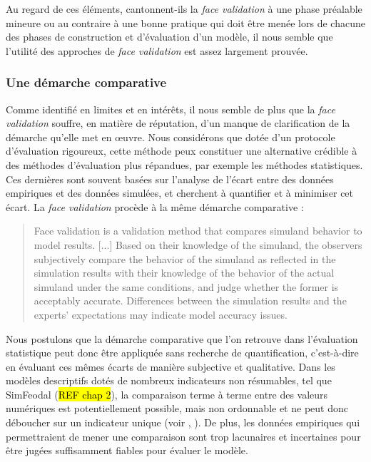 Au regard de ces éléments, cantonnent-ils la \textit{face validation} à une phase préalable mineure ou au contraire à une bonne pratique qui doit être menée lors de chacune des phases de construction et d'évaluation d'un modèle, il nous semble que l'utilité des approches de \textit{face validation} est assez largement prouvée.

\subsubsection{Une démarche comparative}
Comme identifié en limites et en intérêts, il nous semble de plus que la \textit{face validation} souffre, en matière de réputation, d'un manque de clarification de la démarche qu'elle met en œuvre.
Nous considérons que dotée d'un protocole d'évaluation rigoureux, cette méthode peux constituer une alternative crédible à des méthodes d'évaluation plus répandues, par exemple les méthodes statistiques.
Ces dernières sont souvent basées sur l'analyse de l'écart entre des données empiriques et des données simulées, et cherchent à quantifier et à minimiser cet écart.
La \textit{face validation} procède à la même démarche comparative :
\begin{quotation}
		\og Face validation is a validation method that compares simuland behavior to model results. [...] Based on their knowledge of the simuland, the observers subjectively compare the behavior of the simuland as reflected in the simulation results with their knowledge of the behavior of the actual simuland under the same conditions, and judge whether the former is acceptably accurate. Differences between the simulation results and the experts' expectations may indicate model accuracy issues.
	\mbox{}~ \hfill \cite[341]{petty2010verification}
\end{quotation}
Nous postulons que la démarche comparative que l'on retrouve dans l'évaluation statistique peut donc être appliquée sans recherche de quantification, c'est-à-dire en évaluant ces mêmes écarts de manière subjective et qualitative.
Dans les modèles descriptifs dotés de nombreux indicateurs non résumables, tel que SimFeodal (\hl{REF chap 2}), la comparaison terme à terme entre des valeurs numériques est potentiellement possible, mais non ordonnable et ne peut donc déboucher sur un indicateur unique (voir , ).
De plus, les données empiriques qui permettraient de mener une comparaison sont trop lacunaires et incertaines pour être jugées suffisamment fiables pour évaluer le modèle.

